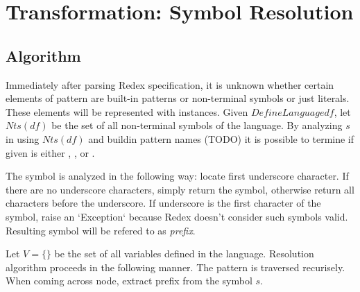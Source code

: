 \section{Transformation: Symbol Resolution}

\subsection{Algorithm}

Immediately after parsing Redex specification, it is unknown whether certain elements of pattern are built-in patterns or non-terminal symbols or just literals. These elements will be represented with \UnresolvedSymbol instances. Given $DefineLanguage df$, let $Nts(df)$ be the set of all non-terminal symbols of the language. By analyzing $s$ in \UnresolvedSymbol using $Nts(df)$ and buildin pattern names (TODO) it is possible to termine if given \UnresolvedSymbol is either \Nt, \BuiltInPattern, or \LiteralPattern.

The symbol is analyzed in the following way: locate first underscore character. If there are no underscore characters, simply return the symbol, otherwise return all characters before the underscore. If underscore is the first character of the symbol, raise an `Exception` because Redex doesn't consider such symbols valid. Resulting symbol will be refered to as \textit{prefix}.

Let $V = \{\}$ be the set of all variables defined in the language.
Resolution algorithm proceeds in the following manner. The pattern is traversed recurisely. When coming across \UnresolvedSymbol node, extract prefix from the symbol $s$.  

